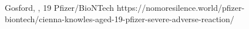           {
            Gosford, , 
          }
          {
            19
          }
          {
            Pfizer/BioNTech
          }
          {
          }
          {
          }
          {
            https://nomoresilence.world/pfizer-biontech/cienna-knowles-aged-19-pfizer-severe-adverse-reaction/
          }

